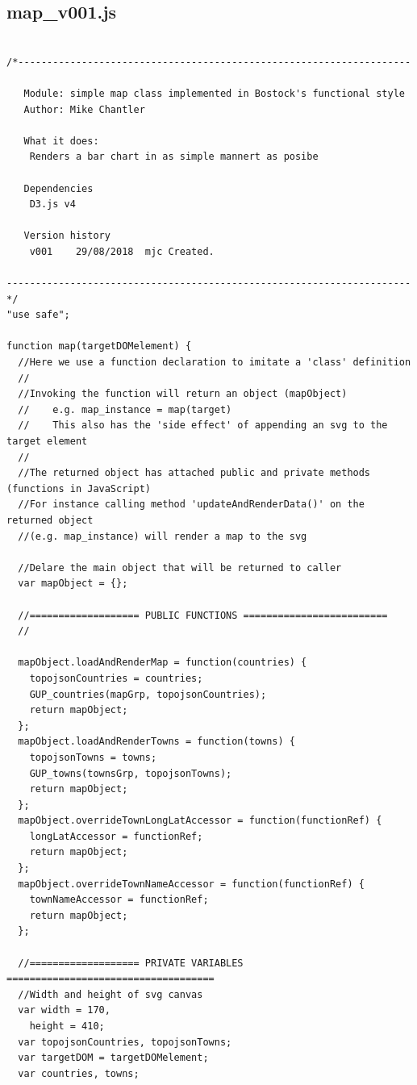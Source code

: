 \documentclass[a4paper, 11pt]{article}
\begin{document}
\newpage

\newpage
\subsection{map\_v001.js}

\begin{verbatim}
    
/*--------------------------------------------------------------------

   Module: simple map class implemented in Bostock's functional style
   Author: Mike Chantler

   What it does:
  	Renders a bar chart in as simple mannert as posibe

   Dependencies
  	D3.js v4

   Version history
  	v001	29/08/2018	mjc	Created.

---------------------------------------------------------------------- */
"use safe";

function map(targetDOMelement) {
  //Here we use a function declaration to imitate a 'class' definition
  //
  //Invoking the function will return an object (mapObject)
  //    e.g. map_instance = map(target)
  //    This also has the 'side effect' of appending an svg to the target element
  //
  //The returned object has attached public and private methods (functions in JavaScript)
  //For instance calling method 'updateAndRenderData()' on the returned object
  //(e.g. map_instance) will render a map to the svg

  //Delare the main object that will be returned to caller
  var mapObject = {};

  //=================== PUBLIC FUNCTIONS =========================
  //

  mapObject.loadAndRenderMap = function(countries) {
    topojsonCountries = countries;
    GUP_countries(mapGrp, topojsonCountries);
    return mapObject;
  };
  mapObject.loadAndRenderTowns = function(towns) {
    topojsonTowns = towns;
    GUP_towns(townsGrp, topojsonTowns);
    return mapObject;
  };
  mapObject.overrideTownLongLatAccessor = function(functionRef) {
    longLatAccessor = functionRef;
    return mapObject;
  };
  mapObject.overrideTownNameAccessor = function(functionRef) {
    townNameAccessor = functionRef;
    return mapObject;
  };

  //=================== PRIVATE VARIABLES ====================================
  //Width and height of svg canvas
  var width = 170,
    height = 410;
  var topojsonCountries, topojsonTowns;
  var targetDOM = targetDOMelement;
  var countries, towns;


\end{verbatim}
\end{document}

